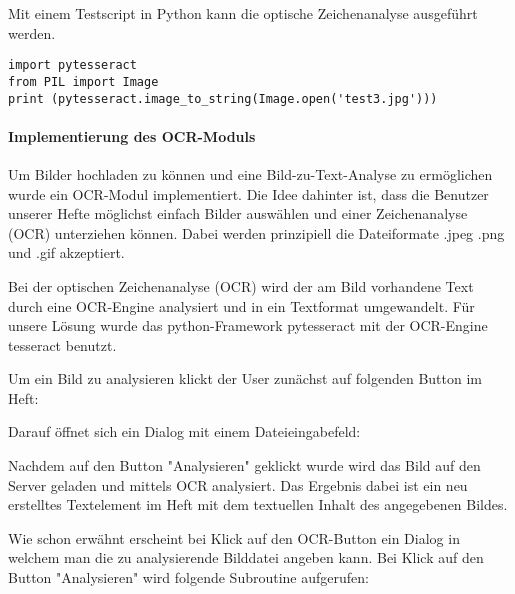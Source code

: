 Mit einem Testscript in Python kann die optische Zeichenanalyse ausgeführt werden.

\begin{lstlisting}[caption={pytesseract-Code}]
import pytesseract
from PIL import Image
print (pytesseract.image_to_string(Image.open('test3.jpg')))
\end{lstlisting}

\paragraph{Implementierung des OCR-Moduls}
Um Bilder hochladen zu können und eine Bild-zu-Text-Analyse zu ermöglichen wurde ein OCR-Modul implementiert. Die Idee dahinter ist, dass die Benutzer unserer Hefte möglichst einfach Bilder auswählen und einer Zeichenanalyse (OCR) unterziehen können. Dabei werden prinzipiell die Dateiformate .jpeg .png und .gif akzeptiert.

Bei der optischen Zeichenanalyse (OCR) wird der am Bild vorhandene Text durch eine OCR-Engine analysiert und in ein Textformat umgewandelt. Für unsere Lösung wurde das python-Framework pytesseract mit der OCR-Engine tesseract benutzt.

Um ein Bild zu analysieren klickt der User zunächst auf folgenden Button im Heft:


Darauf öffnet sich ein Dialog mit einem Dateieingabefeld:


Nachdem auf den Button "Analysieren" geklickt wurde wird das Bild auf den Server geladen und mittels OCR analysiert. Das Ergebnis dabei ist ein neu erstelltes Textelement im Heft mit dem textuellen Inhalt des angegebenen Bildes.

Wie schon erwähnt erscheint bei Klick auf den OCR-Button ein Dialog in welchem man die zu analysierende Bilddatei angeben kann. Bei Klick auf den Button "Analysieren" wird folgende Subroutine aufgerufen:

